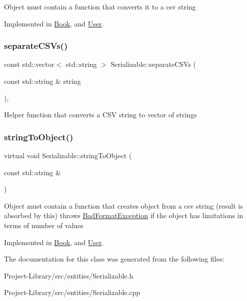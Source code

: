 Object must contain a function that converts it to a csv string 

Implemented in \hyperlink{classBook_a693f08d322fa1395e5bc1f864c380b66}{Book}, and \hyperlink{classUser_a941a44ea8fc61a10d918566e2afc7cbc}{User}.

\mbox{\label{classSerializable_acc2acbf868ec689695498fbb5c863cdb}} 
\subsubsection{\texorpdfstring{separate\+C\+S\+Vs()}{separateCSVs()}}
{\footnotesize\ttfamily const std\+::vector$<$ std\+::string $>$ Serializable\+::separate\+C\+S\+Vs (\begin{DoxyParamCaption}\item[{const std\+::string \&}]{string }\end{DoxyParamCaption})\hspace{0.3cm}{\ttfamily [static]}, {\ttfamily [protected]}}

Helper function that converts a C\+SV string to vector of strings \mbox{\label{classSerializable_abaec34cf73821a3234cf4daea584eab3}} 
\subsubsection{\texorpdfstring{string\+To\+Object()}{stringToObject()}}
{\footnotesize\ttfamily virtual void Serializable\+::string\+To\+Object (\begin{DoxyParamCaption}\item[{const std\+::string \&}]{ }\end{DoxyParamCaption})\hspace{0.3cm}{\ttfamily [pure virtual]}}

Object must contain a function that creates object from a csv string (result is absorbed by this) throws \hyperlink{structBadFormatException}{Bad\+Format\+Exception} if the object has limitations in terms of number of values 

Implemented in \hyperlink{classBook_a260ec829661a21befcf11a34e6c2aeca}{Book}, and \hyperlink{classUser_a45730ce65190e6bb9734b5d797484bf9}{User}.



The documentation for this class was generated from the following files\+:\begin{DoxyCompactItemize}
\item 
Project-\/\+Library/src/entities/Serializable.\+h\item 
Project-\/\+Library/src/entities/Serializable.\+cpp\end{DoxyCompactItemize}
